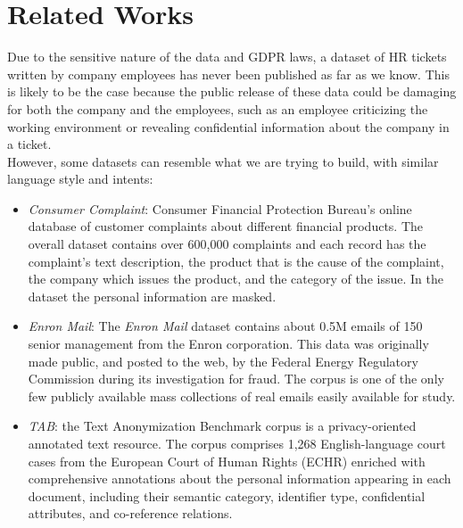 \chapter{Related Works}
\label{sec:RelatedWorks}
Due to the sensitive nature of the data and GDPR laws, a dataset of HR tickets written by company employees has never been published as far as we know. This is likely to be the case because the public release of these data could be damaging for both the company and the employees, such as an employee criticizing the working environment or revealing confidential information about the company in a ticket.\\
However, some datasets can resemble what we are trying to build, with similar language style and intents:
\begin{itemize}
    \item \textit{Consumer Complaint}: Consumer Financial Protection Bureau's online database of customer complaints about different financial products. The overall dataset contains over 600,000 complaints and each record has the complaint's text description, the product that is the cause of the complaint, the company which issues the product, and the category of the issue. In the dataset the personal information are masked.
    \item \textit{Enron Mail}: The \textit{Enron Mail} dataset contains about 0.5M emails of 150 senior management from the Enron corporation. This data was originally made public, and posted to the web, by the Federal Energy Regulatory Commission during its investigation for fraud. The corpus is one of the only few publicly available mass collections of real emails easily available for study.
    \item \textit{TAB}: the Text Anonymization Benchmark corpus\cite{pilan2022text} is a privacy-oriented annotated text resource. The corpus comprises 1,268 English-language court cases from the European Court of Human Rights (ECHR) enriched with comprehensive annotations about the personal information appearing in each document, including their semantic category, identifier type, confidential attributes, and co-reference relations.
\end{itemize}
